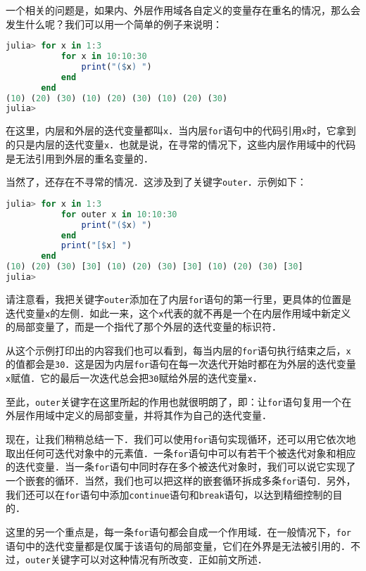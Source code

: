 一个相关的问题是，如果内、外层作用域各自定义的变量存在重名的情况，那么会发生什么呢？我们可以用一个简单的例子来说明：
\begin{lstlisting}[language=julia]
julia> for x in 1:3
           for x in 10:10:30
               print("($x) ")
           end
       end
(10) (20) (30) (10) (20) (30) (10) (20) (30) 
julia> 
\end{lstlisting}

在这里，内层和外层的迭代变量都叫\verb|x|．当内层\verb|for|语句中的代码引用\verb|x|时，它拿到的只是内层的迭代变量\verb|x|．也就是说，在寻常的情况下，这些内层作用域中的代码是无法引用到外层的重名变量的．

当然了，还存在不寻常的情况．这涉及到了关键字\verb|outer|．示例如下：
\begin{lstlisting}[language=julia]
julia> for x in 1:3
           for outer x in 10:10:30
               print("($x) ")
           end
           print("[$x] ")
       end
(10) (20) (30) [30] (10) (20) (30) [30] (10) (20) (30) [30] 
julia> 
\end{lstlisting}

请注意看，我把关键字\verb|outer|添加在了内层\verb|for|语句的第一行里，更具体的位置是迭代变量\verb|x|的左侧．如此一来，这个\verb|x|代表的就不再是一个在内层作用域中新定义的局部变量了，而是一个指代了那个外层的迭代变量的标识符．

从这个示例打印出的内容我们也可以看到，每当内层的\verb|for|语句执行结束之后，\verb|x|的值都会是\verb|30|．这是因为内层\verb|for|语句在每一次迭代开始时都在为外层的迭代变量\verb|x|赋值．它的最后一次迭代总会把\verb|30|赋给外层的迭代变量\verb|x|．

至此，\verb|outer|关键字在这里所起的作用也就很明朗了，即：让\verb|for|语句复用一个在外层作用域中定义的局部变量，并将其作为自己的迭代变量．

现在，让我们稍稍总结一下．我们可以使用\verb|for|语句实现循环，还可以用它依次地取出任何可迭代对象中的元素值．一条\verb|for|语句中可以有若干个被迭代对象和相应的迭代变量．当一条\verb|for|语句中同时存在多个被迭代对象时，我们可以说它实现了一个嵌套的循环．当然，我们也可以把这样的嵌套循环拆成多条\verb|for|语句．另外，我们还可以在\verb|for|语句中添加\verb|continue|语句和\verb|break|语句，以达到精细控制的目的．

这里的另一个重点是，每一条\verb|for|语句都会自成一个作用域．在一般情况下，\verb|for|语句中的迭代变量都是仅属于该语句的局部变量，它们在外界是无法被引用的．不过，\verb|outer|关键字可以对这种情况有所改变．正如前文所述．